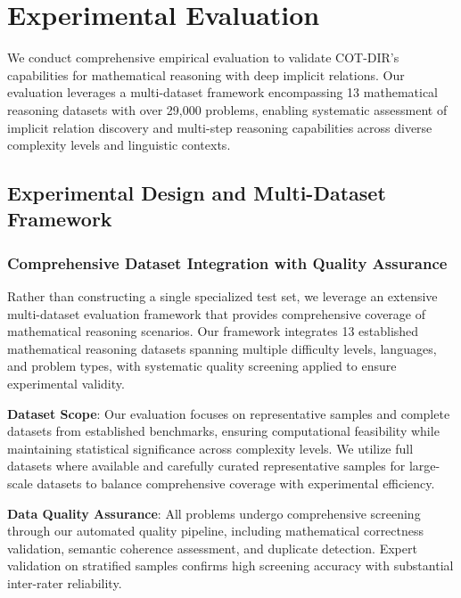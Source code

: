 \section{Experimental Evaluation}
\label{sec:experiments}

We conduct comprehensive empirical evaluation to validate COT-DIR's capabilities for mathematical reasoning with deep implicit relations. Our evaluation leverages a multi-dataset framework encompassing 13 mathematical reasoning datasets with over 29,000 problems, enabling systematic assessment of implicit relation discovery and multi-step reasoning capabilities across diverse complexity levels and linguistic contexts.

\subsection{Experimental Design and Multi-Dataset Framework}

\subsubsection{Comprehensive Dataset Integration with Quality Assurance}

Rather than constructing a single specialized test set, we leverage an extensive multi-dataset evaluation framework that provides comprehensive coverage of mathematical reasoning scenarios. Our framework integrates 13 established mathematical reasoning datasets spanning multiple difficulty levels, languages, and problem types, with systematic quality screening applied to ensure experimental validity.

\textbf{Dataset Scope}: Our evaluation focuses on representative samples and complete datasets from established benchmarks, ensuring computational feasibility while maintaining statistical significance across complexity levels. We utilize full datasets where available and carefully curated representative samples for large-scale datasets to balance comprehensive coverage with experimental efficiency.

\textbf{Data Quality Assurance}: All problems undergo comprehensive screening through our automated quality pipeline, including mathematical correctness validation, semantic coherence assessment, and duplicate detection. Expert validation on stratified samples confirms high screening accuracy with substantial inter-rater reliability.

